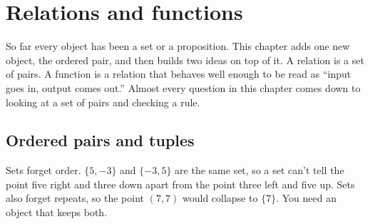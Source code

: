 \section{Relations and functions}

\newcommand{\relPanel}[8]{%
  \begin{scope}[shift={(#1,#2)}]
    \node[font=\small] at (1.3,1.55) {#7};
    \draw (0,0) ellipse (0.75 and 1.2);
    \draw (2.6,0) ellipse (0.75 and 1.2);
    \node[font=\scriptsize] at (0,-1.42) {domain};
    \node[font=\scriptsize] at (2.6,-1.42) {codomain};
    \foreach \k [count=\j] in {#3} {\node[circle,fill,inner sep=1.3pt] (d\j) at (0.3,{((#4+1)/2-\j)*0.62}) {}; \node[font=\scriptsize,inner sep=1pt,left=4pt of d\j] {$\k$};}
    \foreach \k [count=\j] in {#5} {\node[circle,fill,inner sep=1.3pt] (c\j) at (2.3,{((#6+1)/2-\j)*0.62}) {}; \node[font=\scriptsize,inner sep=1pt,right=4pt of c\j] {$\k$};}
    \node[font=\footnotesize,align=center,text width=5cm,anchor=north] at (1.3,-1.65) {#8};
  \end{scope}}
\newcommand{\relMiss}[1]{\node[draw,dashed,circle,inner sep=2.5pt] at (#1) {};}

So far every object has been a set or a proposition. This chapter adds one new object, the ordered pair, and then builds two ideas on top of it. A relation is a set of pairs. A function is a relation that behaves well enough to be read as ``input goes in, output comes out.'' Almost every question in this chapter comes down to looking at a set of pairs and checking a rule.

\subsection{Ordered pairs and tuples}

Sets forget order. $\{5,-3\}$ and $\{-3,5\}$ are the same set, so a set can't tell the point five right and three down apart from the point three left and five up. Sets also forget repeats, so the point $(7,7)$ would collapse to $\{7\}$. You need an object that keeps both.

